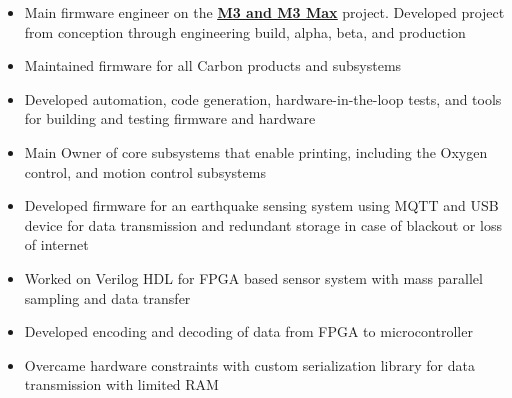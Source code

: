 \documentclass[10pt,a4paper,ragged2e,withhyper]{altacv}
\begin{document}


\makecvheader


\begin{paracol}{2}

\begin{itemize}
\item Main firmware engineer on the \underline{\textbf{\href{https://www.carbon3d.com/products/m3-3d-printer/}{M3 and M3 Max}}} project. Developed project from conception through engineering build, alpha, beta, and production
\item Maintained firmware for all Carbon products and subsystems
\item Developed automation, code generation, hardware-in-the-loop tests, and tools for building and testing firmware and hardware
\item Main Owner of core subsystems that enable printing, including the Oxygen control, and motion control subsystems
\end{itemize}

\divider

\begin{itemize}
\item Developed firmware for an earthquake sensing system using MQTT and USB device for data transmission and redundant storage in case of blackout or loss of internet
\item Worked on Verilog HDL for FPGA based sensor system with mass parallel sampling and data transfer
\item Developed encoding and decoding of data from FPGA to microcontroller
\item Overcame hardware constraints with custom serialization library for data transmission with limited RAM
\end{itemize}


\end{paracol}
\end{document}
